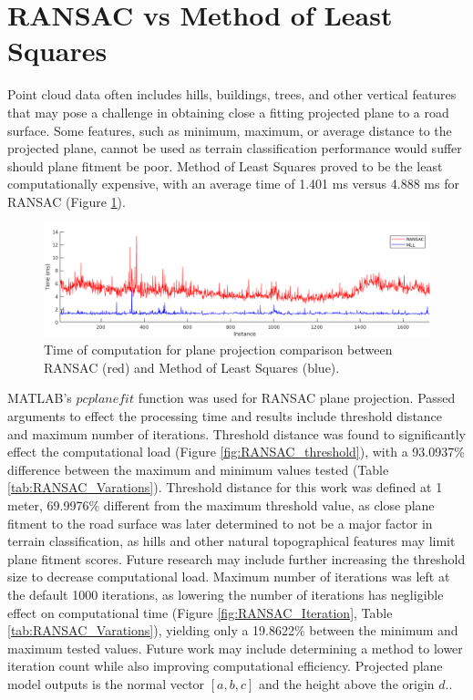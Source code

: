 \documentclass[numbered,pdftex]{ohio-etd}
\begin{document}
{{	}
	
	\section{RANSAC vs Method of Least Squares}\label{sec:ransac-vs-method-of-least-squares}{
	
		{Point cloud data often includes hills, buildings, trees, and other vertical features that may pose a challenge in obtaining close a fitting projected plane to a road surface. Some features, such as minimum, maximum, or average distance to the projected plane, cannot be used as terrain classification performance would suffer should plane fitment be poor. Method of Least Squares proved to be the least computationally expensive, with an average time of 1.401 ms versus 4.888 ms for RANSAC (Figure \ref{fig:RANSAC_vs_MLL}). }
		
		\begin{figure}[H]
			\centering
			\includegraphics[width=1.0\linewidth]{Defense_Images/RANSAC_vs_MLL}
			\caption[RANSAC vs MLS Compute Times]{Time of computation for plane projection comparison between RANSAC (red) and Method of Least Squares (blue). }
			\label{fig:RANSAC_vs_MLL}
		\end{figure}
	
		{MATLAB's  $pcplanefit$ function \cite{MATLAB_PCFITPLANE} was used for RANSAC plane projection. Passed arguments to effect the processing time and results include threshold distance and maximum number of iterations. Threshold distance was found to significantly effect the computational load (Figure \ref{fig:RANSAC_threshold}), with a 93.0937\% difference between the maximum and minimum values tested (Table \ref{tab:RANSAC_Varations}). Threshold distance for this work was defined at 1 meter, 69.9976\% different from the maximum threshold value, as close plane fitment to the road surface was later determined to not be a major factor in terrain classification, as hills and other natural topographical features may limit plane fitment scores. Future research may include further increasing the threshold size to decrease computational load. Maximum number of iterations was left at the default 1000 iterations, as lowering the number of iterations has negligible effect on computational time (Figure \ref{fig:RANSAC_Iteration}, Table \ref{tab:RANSAC_Varations}), yielding only a 19.8622\% between the minimum and maximum tested values. Future work may include determining a method to lower iteration count while also improving computational efficiency. Projected plane model outputs is the normal vector $[a,b,c]$ and the height above the origin $d$..}
		
}}
\end{document}
